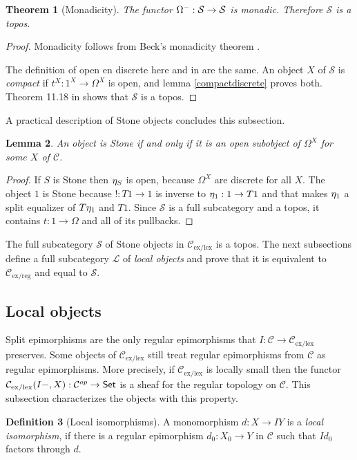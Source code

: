 \documentclass[sort&compress]{elsarticle}
\theoremstyle{plain}
\newtheorem{theorem}{Theorem}
\newtheorem{lemma}[theorem]{Lemma}
\theoremstyle{definition}
\newtheorem{defin}[theorem]{Definition}
\theoremstyle{remark}
\newcommand\cat\mathcal
\newcommand\exlex{_\mathrm{ex/lex}}
\newcommand\exreg{_\mathrm{ex/reg}}
\begin{document}
\begin{theorem}[Monadicity] The functor $\clopow-:\cat S\to\cat S$ is monadic. Therefore $\cat S$ is a topos. \end{theorem}

\begin{proof} Monadicity follows from Beck's monadicity theorem \citep[VI.7]{MR0354798}.

The definition of open en discrete here and in \citet{MR1799865} are the same. An object $X$ of $\cat S$ is \emph{compact} if $t^X:1^X\to \Omega^X$ is open, and lemma \ref{compactdiscrete} proves both. Theorem 11.18 in \citet{MR1799865} shows that $\cat S$ is a topos.\end{proof}

A practical description of Stone objects concludes this subsection.

\begin{lemma} An object is Stone if and only if it is an open subobject of $\Omega^X$ for some $X$ of $\cat C$. \label{Stoneequiv} \end{lemma}

\begin{proof} If $S$ is Stone then $\eta_ S$ is open, because $\Omega^X$ are discrete for all $X$.
The object $1$ is Stone because $!:T1 \to 1$ is inverse to $\eta_ 1: 1\to T1$ and that makes $\eta_ 1$ a split equalizer of $T\eta_ 1$ and $\unit{T1}$.
Since $\cat S$ is a full subcategory and a topos, it contains $t:1\to \Omega$ and all of its pullbacks.
\end{proof}

The full subcategory $\cat S$ of Stone objects in $\cat C\exlex$ is a topos. The next subsections define a full subcategory $\cat L$ of \emph{local objects} and prove that it is equivalent to $\cat C\exreg$ and equal to $\cat S$.

\subsection{Local objects}
Split epimorphisms are the only regular epimorphisms that $I:\cat C \to\cat C\exlex$ preserves. Some objects of $\cat C\exlex$ still treat regular epimorphisms from $\cat C$ as regular epimorphisms. More precisely, if $\cat C\exlex$ is locally small then the functor $\cat C\exlex(I-,X):\cat C\dual \to \Set$ is a sheaf for the regular topology on $\cat C$. This subsection characterizes the objects with this property.

\begin{defin}[Local isomorphisms] A monomorphism $d:X\to IY$ is a \emph{local isomorphism}, if there is a regular epimorphism $d_0:X_0 \to Y$ in $\cat C$ such that $Id_0$ factors through $d$.
\end{defin}
\end{document}
